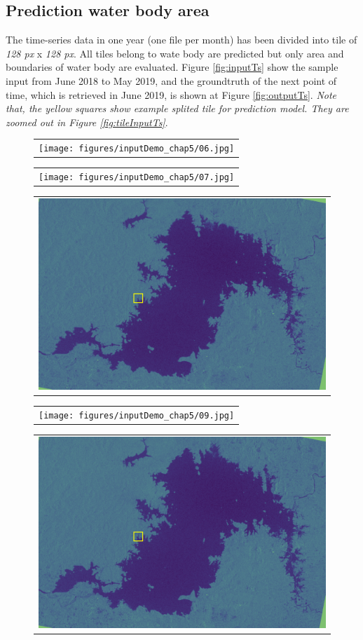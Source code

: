 \subsection{Prediction water body area}

The time-series data in one year (one file per month) has been divided into tile of \textit{128 px } x \textit{128 px}. All tiles belong to wate body are predicted but only area and boundaries of water body are evaluated. Figure \ref{fig:inputTs} show the sample input from June 2018 to May 2019, and the groundtruth of the next point of time, which is retrieved in June 2019, is shown at Figure \ref{fig:outputTs}. \textit{Note that, the yellow squares show example splited tile for prediction model. They are zoomed out in Figure \ref{fig:tileInputTs}}.

\begin{figure}[h!]
	\begin{center}
        \begin{tabular}[b]{c}
            \texttt{[image: figures/inputDemo\_chap5/06.jpg]}
        \end{tabular}
        \begin{tabular}[b]{c}
            \texttt{[image: figures/inputDemo\_chap5/07.jpg]}
        \end{tabular}
        \begin{tabular}[b]{c}
            \includegraphics[width=0.3\linewidth]{figures/inputDemo_chap5/08.jpg}
		\end{tabular}
        \begin{tabular}[b]{c}
            \texttt{[image: figures/inputDemo\_chap5/09.jpg]}
        \end{tabular}
        \begin{tabular}[b]{c}
            \includegraphics[width=0.3\linewidth]{figures/inputDemo_chap5/10.jpg}
        \end{tabular}
        \begin{tabular}[b]{c}

\end{tabular}
\end{center}
\end{figure}
